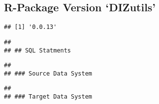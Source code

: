 \documentclass[
]{article}
\begin{document}
\hypertarget{r-package-version-dizutils}{%
\subsection{R-Package Version
`DIZutils'}\label{r-package-version-dizutils}}

\begin{verbatim}
## [1] '0.0.13'
\end{verbatim}

\begin{verbatim}
## 
## ## SQL Statments
\end{verbatim}

\begin{verbatim}
## 
## ### Source Data System
\end{verbatim}

\begin{verbatim}
## 
## ### Target Data System
\end{verbatim}
\end{document}
